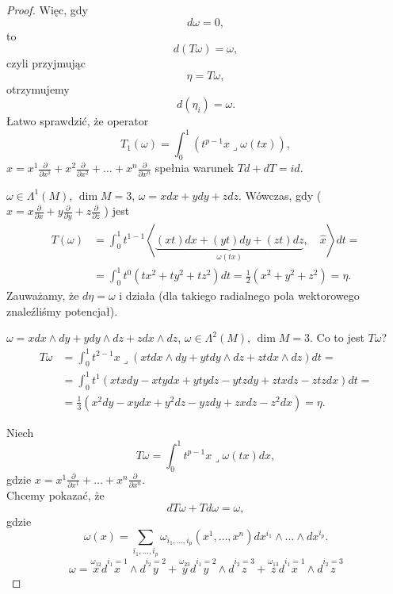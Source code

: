 \documentclass[../main.tex]{subfiles}
\begin{document}
\begin{proof}
    Więc, gdy
    \[
        d\omega = 0
    ,\]
to
    \[
        d(T\omega) = \omega
    ,\]
    czyli przyjmując
 \[
\eta = T\omega
,\]
otrzymujemy
\[
    d(\eta_i) = \omega
.\]
Łatwo sprawdzić, że operator
\[
    T_1(\omega) = \int_0^1\left(t^{p-1}x \lrcorner \omega(tx)\right)
,\]
$x = x^1 \frac{\partial }{\partial x^1} + x^2 \frac{\partial }{\partial x^2} + \ldots + x^n \frac{\partial }{\partial x^n}$ spełnia warunek $Td + dT = id$.
 \begin{przyklad}
     $\omega \in \Lambda^1(M)$, $\dim M = 3$, $\omega = xdx + ydy + zdz$. Wówczas, gdy ($\hat{x} = x \frac{\partial }{\partial x} + y \frac{\partial }{\partial y} + z \frac{\partial }{\partial z}$ ) jest
     \begin{align*}
         T(\omega) &= \int_0^1 t^{1-1} \left<\underbrace{(xt)dx + (yt)dy + (zt)dz}_{\omega(tx)},\quad \hat{x} \right>dt = \\
         &= \int_0^1t^0\left( tx^2 + ty^2 + tz^2 \right) dt = \frac{1}{2}\left( x^2 + y^2 + z^2 \right) = \eta.
     \end{align*}
     Zauważamy, że $d\eta = \omega$ i działa (dla takiego radialnego pola wektorowego znaleźliśmy potencjał).
\end{przyklad}
\begin{przyklad}
    $\omega = xdx\land dy + ydy\land dz + zdx\land dz$,  $\omega\in \Lambda^2(M)$, $\dim M = 3$.
    Co to jest $T\omega$?
    \begin{align*}
        T\omega &= \int_0^1t^{2-1} x \lrcorner \left( xt dx\land dy + yt dy\land dz + zt dx\land dz \right) dt = \\
        &= \int_0^1 t^1\left( xtx dy - xt ydx + yt ydz - ytzdy + ztxdz - ztzdx \right)dt = \\
        &= \frac{1}{3}\left( x^2dy - xydx + y^2dz - yzdy + zxdz - z^2dx \right) = \eta
    .\end{align*}
\end{przyklad}
Niech
\[
    T\omega = \int_0^1 t^{p-1} x \lrcorner \omega(tx)dx
,\]
gdzie $x = x^1 \frac{\partial }{\partial x^1} + \ldots + x^n \frac{\partial }{\partial x^n} $.\\
Chcemy pokazać, że
\[
dT\omega + Td\omega = \omega
,\]
gdzie
\[
    \omega(x) = \sum_{i_1, \ldots, i_p}\omega_{i_1, \ldots, i_p}(x^1, \ldots, x^n)dx^{i_1}\land \ldots\land dx^{i_p}
.\]
\[
    \omega = \overset{\omega_{12}}{x} d\overset{i_1 = 1}{x}\land d\overset{i_2 = 2}{y} + \overset{\omega_{23}}{y}d\overset{i_1 = 2}{y}\land d\overset{i_2 = 3}{z} + \overset{\omega_{13}}{z}d\overset{i_1 = 1}{x}\land d\overset{i_2 = 3}{z}
\]
\end{proof}
\end{document}
